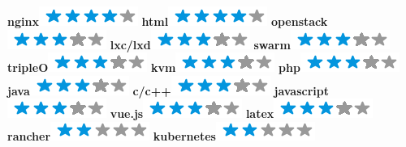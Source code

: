 \documentclass[]{friggeri-cv}
\begin{document}
\begin{aside}
        \textbf{nginx}\includegraphics[scale=0.40]{img/4stars.png}
        \textbf{html}\includegraphics[scale=0.40]{img/4stars.png}
        \textbf{openstack}\includegraphics[scale=0.40]{img/3stars.png}
        \textbf{lxc/lxd}\includegraphics[scale=0.40]{img/3stars.png}
        \textbf{swarm}\includegraphics[scale=0.40]{img/3stars.png}
        \textbf{tripleO}\includegraphics[scale=0.40]{img/3stars.png}
        \textbf{kvm}\includegraphics[scale=0.40]{img/3stars.png}
        \textbf{php}\includegraphics[scale=0.40]{img/3stars.png}
        \textbf{java}\includegraphics[scale=0.40]{img/3stars.png}
        \textbf{c/c++}\includegraphics[scale=0.40]{img/3stars.png}
        \textbf{javascript}\includegraphics[scale=0.40]{img/3stars.png}
        \textbf{vue.js}\includegraphics[scale=0.40]{img/3stars.png}
        \textbf{latex}\includegraphics[scale=0.40]{img/3stars.png}
        \textbf{rancher}\includegraphics[scale=0.40]{img/2stars.png}
        \textbf{kubernetes}\includegraphics[scale=0.40]{img/2stars.png}
        ~

\end{aside}
\end{document}
